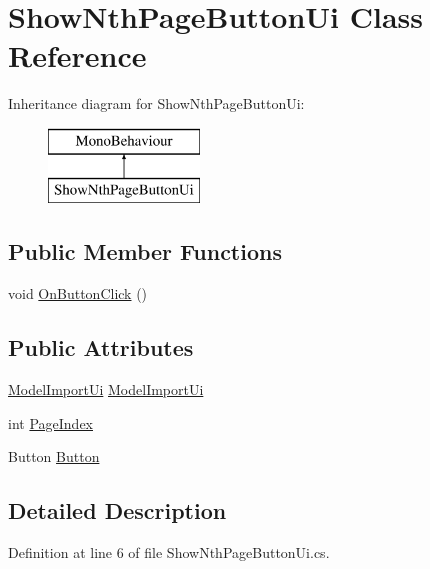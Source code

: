 \hypertarget{class_show_nth_page_button_ui}{}\section{Show\+Nth\+Page\+Button\+Ui Class Reference}
\label{class_show_nth_page_button_ui}
Inheritance diagram for Show\+Nth\+Page\+Button\+Ui\+:\begin{figure}[H]
\begin{center}
\leavevmode
\includegraphics[height=2.000000cm]{class_show_nth_page_button_ui}
\end{center}
\end{figure}
\subsection*{Public Member Functions}
\begin{DoxyCompactItemize}
\item 
void \mbox{\hyperlink{class_show_nth_page_button_ui_aa1688012097d455138dc09cea38f6287}{On\+Button\+Click}} ()
\end{DoxyCompactItemize}
\subsection*{Public Attributes}
\begin{DoxyCompactItemize}
\item 
\mbox{\hyperlink{class_model_import_ui}{Model\+Import\+Ui}} \mbox{\hyperlink{class_show_nth_page_button_ui_adc4338f73874204ed3c86faa877cd2eb}{Model\+Import\+Ui}}
\item 
int \mbox{\hyperlink{class_show_nth_page_button_ui_ad2b792df63716831e4998506efe008e5}{Page\+Index}}
\item 
Button \mbox{\hyperlink{class_show_nth_page_button_ui_a08c2eeefe4be66c7634ddd116a32a9a2}{Button}}
\end{DoxyCompactItemize}


\subsection{Detailed Description}


Definition at line 6 of file Show\+Nth\+Page\+Button\+Ui.\+cs.



